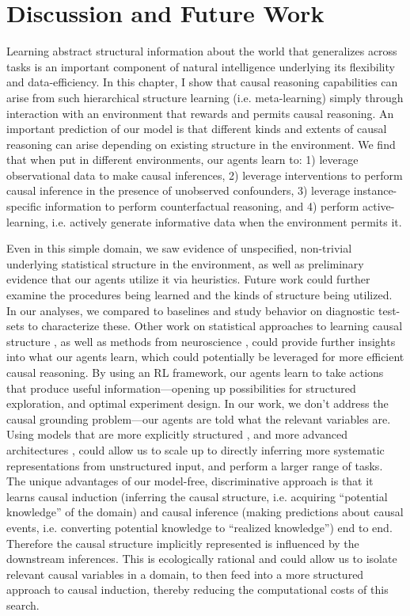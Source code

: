 \section{Discussion and Future Work}

Learning abstract structural information about the world that generalizes across tasks is an important component of natural intelligence underlying its flexibility and data-efficiency. In this chapter, I show that causal reasoning capabilities can arise from such hierarchical structure learning (i.e. meta-learning) simply through interaction with an environment that rewards and permits causal reasoning. An important prediction of our model is that different kinds and extents of causal reasoning can arise depending on existing structure in the environment. We find that when put in different environments, our agents learn to: 1) leverage observational data to make causal inferences, 2) leverage interventions to perform causal inference in the presence of unobserved confounders, 3) leverage instance-specific information to perform counterfactual reasoning, and 4) perform active-learning, i.e. actively generate informative data when the environment permits it. 

Even in this simple domain, we saw evidence of unspecified, non-trivial underlying statistical structure in the environment, as well as preliminary evidence that our agents utilize it via heuristics. Future work could further examine the procedures being learned and the kinds of structure being utilized. In our analyses, we compared to baselines and study behavior on diagnostic test-sets to characterize these. Other work on statistical approaches to learning causal structure \citep{bengio2019meta, janzing2009telling, hoyer2009nonlinear}, as well as methods from neuroscience \citep{wang2018}, could provide further insights into what our agents learn, which could potentially be leveraged for more efficient causal reasoning. By using an RL framework, our agents learn to take actions that produce useful information---opening up possibilities for structured exploration, and optimal experiment design. In our work, we don't address the causal grounding problem---our agents are told what the relevant variables are. Using models that are more explicitly structured \citep[e.g.][]{andreas2016neural,battaglia2018relational, ganin2018synthesizing}, and more advanced architectures \citep[e.g.][]{hester2017deep,hessel2018multi,espeholt2018impala}, could allow us to scale up to directly inferring more systematic representations from unstructured input, and perform a larger range of tasks. The unique advantages of our model-free, discriminative approach is that it learns causal induction (inferring the causal structure, i.e. acquiring ``potential knowledge'' of the domain) and causal inference (making predictions about causal events, i.e. converting potential knowledge to ``realized knowledge'') end to end. Therefore the causal structure implicitly represented is influenced by the downstream inferences. This is ecologically rational and could allow us to isolate relevant causal variables in a domain, to then feed into a more structured approach to causal induction, thereby reducing the computational costs of this search.

